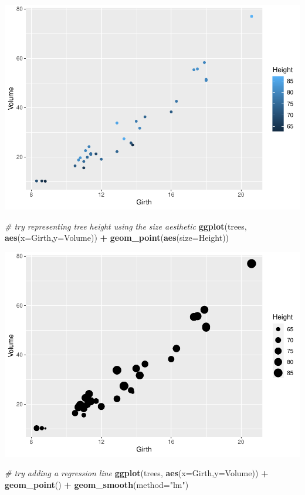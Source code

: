 \documentclass[
]{article}
\newenvironment{Shaded}{\begin{snugshade}}{\end{snugshade}}
\newcommand{\AttributeTok}[1]{\textcolor[rgb]{0.13,0.29,0.53}{#1}}
\newcommand{\CommentTok}[1]{\textcolor[rgb]{0.56,0.35,0.01}{\textit{#1}}}
\newcommand{\FunctionTok}[1]{\textcolor[rgb]{0.13,0.29,0.53}{\textbf{#1}}}
\newcommand{\NormalTok}[1]{#1}
\newcommand{\SpecialCharTok}[1]{\textcolor[rgb]{0.81,0.36,0.00}{\textbf{#1}}}
\newcommand{\StringTok}[1]{\textcolor[rgb]{0.31,0.60,0.02}{#1}}
\begin{document}
\includegraphics{module1_3_files/figure-latex/unnamed-chunk-9-1.pdf}

\begin{Shaded}
\begin{Highlighting}[]
    \CommentTok{\# try representing tree height using the size aesthetic}
\FunctionTok{ggplot}\NormalTok{(trees, }\FunctionTok{aes}\NormalTok{(}\AttributeTok{x=}\NormalTok{Girth,}\AttributeTok{y=}\NormalTok{Volume)) }\SpecialCharTok{+}
  \FunctionTok{geom\_point}\NormalTok{(}\FunctionTok{aes}\NormalTok{(}\AttributeTok{size=}\NormalTok{Height))}
\end{Highlighting}
\end{Shaded}

\includegraphics{module1_3_files/figure-latex/unnamed-chunk-9-2.pdf}

\begin{Shaded}
\begin{Highlighting}[]
   \CommentTok{\# try adding a regression line}
\FunctionTok{ggplot}\NormalTok{(trees, }\FunctionTok{aes}\NormalTok{(}\AttributeTok{x=}\NormalTok{Girth,}\AttributeTok{y=}\NormalTok{Volume)) }\SpecialCharTok{+}
  \FunctionTok{geom\_point}\NormalTok{() }\SpecialCharTok{+}
  \FunctionTok{geom\_smooth}\NormalTok{(}\AttributeTok{method=}\StringTok{"lm"}\NormalTok{)}
\end{Highlighting}
\end{Shaded}
\end{document}
